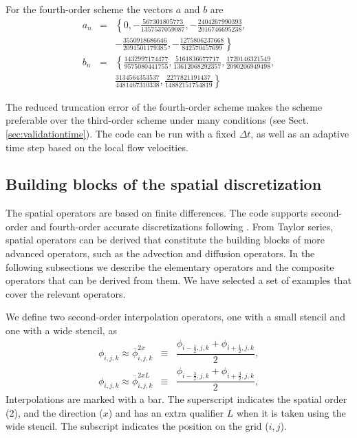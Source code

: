 \documentclass[gmd,manuscript]{copernicus}
\begin{document}
For the fourth-order scheme the vectors $a$ and $b$ are
\begin{eqnarray}
\nonumber a_n & = & \left\{0, -\frac{567301805773}{1357537059087},
-\frac{2404267990393}{2016746695238},\right.\\
& & \left. -\frac{3550918686646}{2091501179385},
-\frac{1275806237668}{842570457699} \right\}\\
\nonumber b_n & = & \left\{\frac{1432997174477}{9575080441755}, \frac{5161836677717}{13612068292357},
\frac{1720146321549}{2090206949498},\right.\\
& & \left. \frac{3134564353537}{4481467310338},
\frac{2277821191437}{14882151754819} \right\}
\end{eqnarray}

The reduced truncation error of the fourth-order scheme makes the scheme preferable over the third-order scheme under many conditions (see Sect. \ref{sec:validationtime}). The code can be run with a fixed $\Delta t$, as well as an adaptive time step based on the local flow velocities.

\subsection{Building blocks of the spatial discretization}\label{sec:buiding_blocks}
The spatial operators are based on finite differences. The code supports second-order and fourth-order accurate discretizations following \citet{Morinishi1998, Vasilyev2000}. From Taylor series, spatial operators can be derived that constitute the building blocks of more advanced operators, such as the advection and diffusion operators. In the following subsections we describe the elementary operators and the composite operators that can be derived from them. We have selected a set of examples that cover the relevant operators.

We define two second-order interpolation operators, one with a small stencil and one with a wide stencil, as
\begin{eqnarray}
\phi_{i,j,k} \approx \overline{\phi}^{2x }_{i,j,k} & \equiv & \dfrac{\phi_{i-\frac{1}{2},j,k} + \phi_{i+\frac{1}{2},j,k}}{2},\\
\phi_{i,j,k} \approx \overline{\phi}^{2xL}_{i,j,k} & \equiv & \dfrac{\phi_{i-\frac{3}{2},j,k} + \phi_{i+\frac{3}{2},j,k}}{2},
\end{eqnarray}
Interpolations are marked with a bar. The superscript indicates the spatial order (2), and the direction ($x$) and has an extra qualifier $L$ when it is taken using the wide stencil. The subscript indicates the position on the grid ($i,j$).
\end{document}
